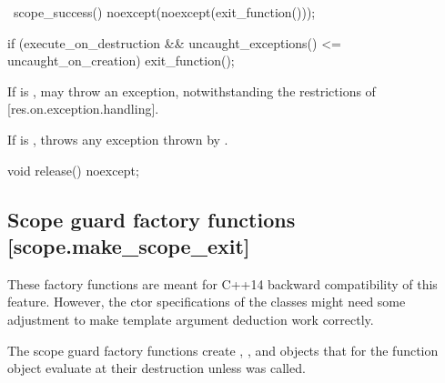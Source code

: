 \documentclass[ebook,11pt,article]{memoir}
\begin{document}
\begin{itemdecl}
~scope_success() noexcept(noexcept(exit_function()));
\end{itemdecl}

\begin{itemdescr}
\pnum
\effects
\begin{codeblock}
if (execute_on_destruction 
   && uncaught_exceptions() <= uncaught_on_creation)
	exit_function();   
\end{codeblock}

\pnum
\remarks
If  is ,  may throw an exception, notwithstanding the restrictions of [res.on.exception.handling].

\pnum
\throws
If  is , throws any exception thrown by .

\end{itemdescr}

\begin{itemdecl}
void release() noexcept;
\end{itemdecl}

\begin{itemdescr}
\pnum
\end{itemdescr}

\newpage

\subsection {Scope guard factory functions [scope.make_scope_exit]}
\begin{note}
These factory functions are meant for C++14 backward compatibility of this feature. 
However, the ctor specifications of the classes might need some adjustment to make template argument deduction work correctly.
\end{note}

\pnum
The scope guard factory functions create , , and  objects that for the function object  evaluate  at their destruction unless  was called.
\end{document}
